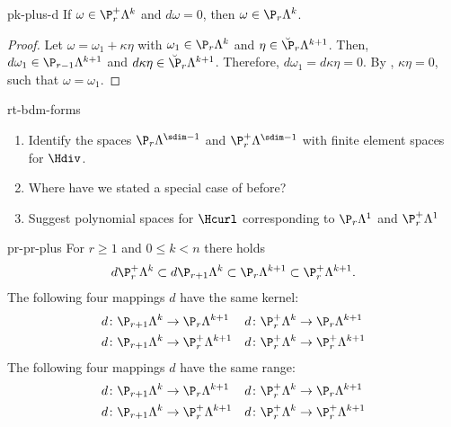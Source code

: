 \begin{Lemma}{pk-plus-d}
  If $\omega\in \P_r^+\Lambda^k$ and $d\omega=0$, then
  $\omega\in\P_r\Lambda^k$.
\end{Lemma}

\begin{proof}
  Let $\omega = \omega_1 + \kappa\eta$ with $\omega_1\in\P_r\Lambda^k$
  and $\eta\in \breve\P_r\Lambda^{k+1}$. Then,
  $d\omega_1\in\P_{r-1}\Lambda^{k+1}$ and
  $d\kappa\eta\in \breve\P_r\Lambda^{k+1}$. Therefore,
  $d\omega_1 = d\kappa\eta = 0$. By
  , $\kappa\eta=0$, such that
  $\omega=\omega_1$.
\end{proof}

\begin{Problem}{rt-bdm-forms}
  \begin{enumerate}
  \item   Identify the spaces $\P_r \Lambda^{\sdim-1}$ and
    $\P_r^+ \Lambda^{\sdim-1}$ with finite element spaces for
    $\Hdiv$.
  \item Where have we stated a special case of
     before?
  \item Suggest polynomial spaces for $\Hcurl$ corresponding to
    $\P_r \Lambda^{1}$ and $\P_r^+ \Lambda^{1}$
  \end{enumerate}
\end{Problem}

\begin{Lemma}{pr-pr-plus}
  For $r\ge 1$ and $0\le k < n$ there holds
  \begin{gather}
    d\P_{r}^+\Lambda^k \subset d\P_{r+1}\Lambda^k
    \subset \P_r\Lambda^{k+1}
    \subset \P_r^+\Lambda^{k+1}.
  \end{gather}
  The following four mappings $d$ have the same kernel:
  \begin{gather}
    \begin{aligned}
      d\colon \P_{r+1}\Lambda^k &\to \P_{r}\Lambda^{k+1}
      &
      d\colon \P_r^+\Lambda^k &\to \P_{r}\Lambda^{k+1}
      \\
      d\colon \P_{r+1}\Lambda^k &\to \P_{r}^+\Lambda^{k+1}
      &
      d\colon \P_r^+\Lambda^k &\to \P_{r}^+\Lambda^{k+1}
    \end{aligned}
  \end{gather}
  The following four mappings $d$ have the same range:
  \begin{gather}
    \begin{aligned}
      d\colon \P_{r+1}\Lambda^k &\to \P_{r}\Lambda^{k+1}
      &
      d\colon \P_{r}^+\Lambda^k &\to \P_{r}\Lambda^{k+1}
      \\
      d\colon \P_{r+1}\Lambda^k &\to \P_{r}^+\Lambda^{k+1}
      &
      d\colon \P_{r}^+\Lambda^k &\to \P_{r}^+\Lambda^{k+1}
    \end{aligned}
  \end{gather}
\end{Lemma}

